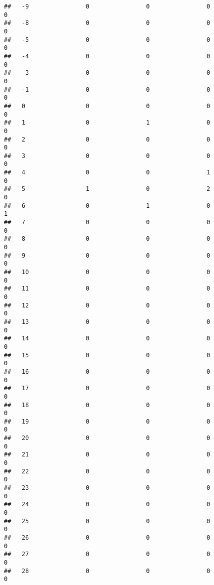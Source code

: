 \documentclass[]{article}
\begin{document}
\begin{verbatim}
##   -9                0                0                0                0
##   -8                0                0                0                0
##   -5                0                0                0                0
##   -4                0                0                0                0
##   -3                0                0                0                0
##   -1                0                0                0                0
##   0                 0                0                0                0
##   1                 0                1                0                0
##   2                 0                0                0                0
##   3                 0                0                0                0
##   4                 0                0                1                0
##   5                 1                0                2                0
##   6                 0                1                0                1
##   7                 0                0                0                0
##   8                 0                0                0                0
##   9                 0                0                0                0
##   10                0                0                0                0
##   11                0                0                0                0
##   12                0                0                0                0
##   13                0                0                0                0
##   14                0                0                0                0
##   15                0                0                0                0
##   16                0                0                0                0
##   17                0                0                0                0
##   18                0                0                0                0
##   19                0                0                0                0
##   20                0                0                0                0
##   21                0                0                0                0
##   22                0                0                0                0
##   23                0                0                0                0
##   24                0                0                0                0
##   25                0                0                0                0
##   26                0                0                0                0
##   27                0                0                0                0
##   28                0                0                0                0

\end{verbatim}
\end{document}
